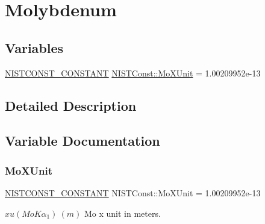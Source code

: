 \hypertarget{group___n_i_s_t_const-_molybdenum}{}\section{Molybdenum}
\label{group___n_i_s_t_const-_molybdenum}
\subsection*{Variables}
\begin{DoxyCompactItemize}
\item 
\mbox{\hyperlink{group___n_i_s_t_const-_macros_ga2b0fc1d7452373f816175dd86ce26729}{N\+I\+S\+T\+C\+O\+N\+S\+T\+\_\+\+C\+O\+N\+S\+T\+A\+NT}} \mbox{\hyperlink{group___n_i_s_t_const-_molybdenum_gae993f805405c16a8feb601813053bc5f}{N\+I\+S\+T\+Const\+::\+Mo\+X\+Unit}} = 1.\+00209952e-\/13
\end{DoxyCompactItemize}


\subsection{Detailed Description}


\subsection{Variable Documentation}
\mbox{\label{group___n_i_s_t_const-_molybdenum_gae993f805405c16a8feb601813053bc5f}} 
\subsubsection{\texorpdfstring{Mo\+X\+Unit}{MoXUnit}}
{\footnotesize\ttfamily \mbox{\hyperlink{group___n_i_s_t_const-_macros_ga2b0fc1d7452373f816175dd86ce26729}{N\+I\+S\+T\+C\+O\+N\+S\+T\+\_\+\+C\+O\+N\+S\+T\+A\+NT}} N\+I\+S\+T\+Const\+::\+Mo\+X\+Unit = 1.\+00209952e-\/13}

$xu(MoK\alpha_1) \ (m)$ Mo x unit in meters. 